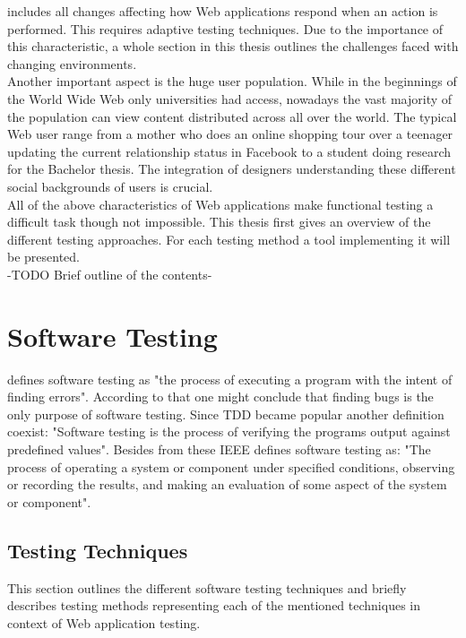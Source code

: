 \documentclass[12pt, notitlepage]{article}
\begin{document}
includes all changes affecting how Web applications respond when an action is performed. 
This requires adaptive testing techniques. Due to the importance of this characteristic, a whole section in this thesis outlines the challenges faced
with changing environments.\\ 
Another important aspect is the huge user population. While in the beginnings of the World Wide Web only universities had access,
nowadays the vast majority of the population can view content distributed across all over the world. The typical Web user range from a
mother who does an online shopping tour over a teenager updating the current relationship status in Facebook to a student doing research for
the Bachelor thesis. The integration of designers understanding these different social backgrounds of users is crucial.\\


All of the above characteristics of Web applications make functional testing a difficult task though not impossible.
This thesis first gives an overview of the different testing approaches. For each 
testing method a tool implementing it will be presented.\\
-TODO Brief outline of the contents-
\newpage


\section{Software Testing}
\cite{art-of-software-testing} defines software testing as "the process of executing a program with the intent of finding errors".
According to that one might conclude that finding bugs is the only purpose of software testing. Since TDD\cite{tdd} became popular
another definition coexist: "Software testing is the process of verifying the programs output against predefined values". Besides from 
these IEEE\cite{ieee-definition} defines software testing as: "The process of operating a system or component under specified conditions, observing or recording the results, and making an evaluation of some aspect of the system or component".\\
\subsection{Testing Techniques}
This section outlines the different software testing techniques\cite{testing-methods} and briefly describes testing methods representing each of the mentioned techniques in context of Web application testing.
\end{document}
